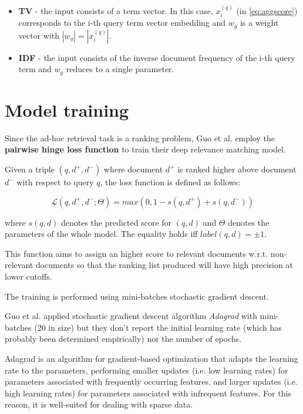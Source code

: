 \begin{itemize}
\item \textbf{TV} - the input consists of a term vector.
In this case, $x_i^{(q)}$ (in \ref{eq:aggscore}) corresponds to the i-th query term vector embedding and
$w_g$ is a weight vector with $|w_g| = |x_i^{(q)}|$.
\item \textbf{IDF} - the input consists of the inverse document frequency of
the i-th query term and $w_g$ reduces to a single parameter.
\end{itemize}

\section{Model training}

Since the ad-hoc retrieval task is a ranking problem, Guo et al.
\cite{drmm} employ the \textbf{pairwise hinge loss function} to train their deep relevance matching model.

Given a triple $(q, d^+, d^-)$ where document $d^+$ is ranked higher above
document $d^-$ with respect to query $q$, the loss function is defined as follows:

\begin{equation}
\label{eq:hinge}
\tag{Hinge loss function}
\mathcal{L} (q, d^+, d^-; \Theta) = max(0, 1 - s(q, d^+) + s(q, d^-))
\end{equation}

where $s(q,d)$ denotes the predicted score for $(q,d)$ and $\Theta$ denotes the parameters of the whole model. The equality holds iff $label(q, d) = \pm 1$.

This function aims to assign an higher score to relevant documents w.r.t. non-relevant documents so that the ranking list produced will have high precision at lower cutoffs.

The training is performed using mini-batches stochastic gradient descent.

Guo et al. \cite{drmm} applied stochastic gradient descent algorithm \textit{Adagrad} with mini-batches (20 in size) but they don't report the initial learning rate (which has probably been determined empirically) nor the number of epochs.

Adagrad is an algorithm for gradient-based optimization that adapts the learning rate to the parameters, performing smaller updates (i.e. low learning rates) for parameters associated with frequently occurring features, and larger updates (i.e. high learning rates) for parameters associated with infrequent features.
For this reason, it is well-suited for dealing with sparse data.

